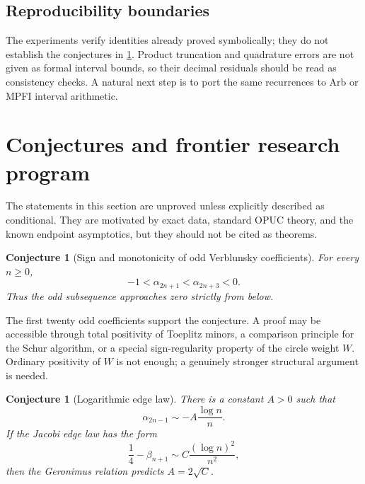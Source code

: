 \documentclass[11pt,oneside]{article}
\newtheorem{conjecture}[theorem]{Conjecture}
\theoremstyle{definition}
\begin{document}
\subsection{Reproducibility boundaries}

The experiments verify identities already proved symbolically; they do not establish the
conjectures in \cref{sec:conjectures}. Product truncation and quadrature errors are not given
as formal interval bounds, so their decimal residuals should be read as consistency checks.
A natural next step is to port the same recurrences to Arb or MPFI interval arithmetic.

\section{Conjectures and frontier research program}
\label{sec:conjectures}

\begin{conjecturebox}
The statements in this section are unproved unless explicitly described as conditional.
They are motivated by exact data, standard OPUC theory, and the known endpoint asymptotics,
but they should not be cited as theorems.
\end{conjecturebox}

\begin{conjecture}[Sign and monotonicity of odd Verblunsky coefficients]
\label{conj:alpha-monotone}
For every \(n\ge0\),
\begin{equation}
 -1<\alpha_{2n+1}<\alpha_{2n+3}<0.
 \label{eq:conj-alpha-monotone}
\end{equation}
Thus the odd subsequence approaches zero strictly from below.
\end{conjecture}

The first twenty odd coefficients support the conjecture. A proof may be accessible through
total positivity of Toeplitz minors, a comparison principle for the Schur algorithm, or a
special sign-regularity property of the circle weight \(W\). Ordinary positivity of \(W\) is
not enough; a genuinely stronger structural argument is needed.

\begin{conjecture}[Logarithmic edge law]
\label{conj:alpha-asymptotic}
There is a constant \(A>0\) such that
\begin{equation}
 \alpha_{2n-1}\sim-A\frac{\log n}{n}.
 \label{eq:alpha-asymptotic}
\end{equation}
If the Jacobi edge law has the form
\begin{equation}
 \frac14-\beta_{n+1}\sim C\frac{(\log n)^2}{n^2},
 \label{eq:beta-edge-conj}
\end{equation}
then the Geronimus relation predicts \(A=2\sqrt C\).
\end{conjecture}
\end{document}
